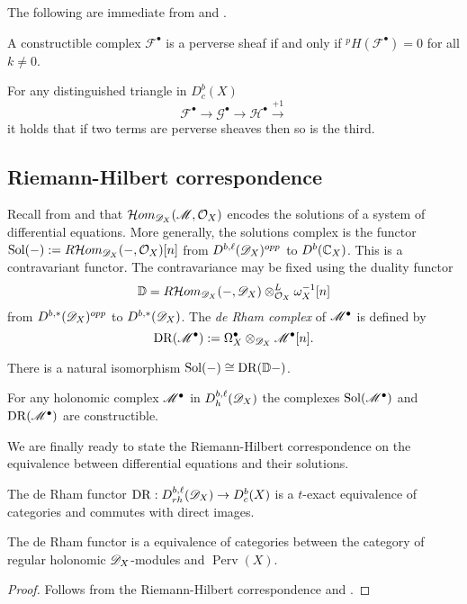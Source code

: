   The following are immediate from  and .
  \begin{proposition}
    A constructible complex $\mathcal{F}^\bullet$ is a perverse sheaf if and only if $^pH(\mathcal{F}^\bullet) = 0$ for all $k\neq 0$.
  \end{proposition}
  \begin{proposition}
    For any distinguished triangle in $D_c^b(X)$
    $$\mathcal{F}^\bullet \to \mathcal{G}^\bullet \to \mathcal{H}^\bullet \xrightarrow{+1} $$
    it holds that if two terms are perverse sheaves then so is the third.
  \end{proposition}
\subsection{Riemann-Hilbert correspondence}
  Recall from  and  that $\mathcal{H}om_{\mathscr{D}_X}(\mathscr{M}, \mathcal{O}_X)$ encodes the solutions of a system of differential equations.
  More generally, the solutions complex is the functor $\operatorname{Sol}({-}) := R \mathcal{H}om_{\mathscr{D}_X}({-},\mathcal{O}_X)[n]$ from $D^{b,\ell}(\mathscr{D}_X)^{opp}$ to $D^{b}(\mathbb{C}_X)$.
  This is a contravariant functor.
  The contravariance may be fixed using the duality functor
  $$\mathbb{D} = R\mathcal{H}om_{\mathscr{D}_X}({-},\mathscr{D}_X)\otimes_{\mathcal{O}_X}^L\omega_X^{-1}[n]$$
  from $D^{b,*}(\mathscr{D}_X)^{opp}$ to $D^{b,*}(\mathscr{D}_X)$.
  The {\it de Rham complex} of $\mathscr{M}^\bullet$ is defined by
  $$\operatorname{DR}(\mathscr{M}^\bullet):=\Omega_X^\bullet \otimes_{\mathscr{D}_X} \mathscr{M}^\bullet[n]. $$
  \begin{proposition}{\cite[Theorem 5.3.1. ]{dimca2004sheaves}}
    There is a natural isomorphism $\operatorname{Sol}({-}) \cong \operatorname{DR}(\mathbb{D}{-})$.
  \end{proposition}
  \begin{proposition}{\cite[Theorem 5.3.1.]{dimca2004sheaves}}
    For any holonomic complex $\mathscr{M}^\bullet$ in $D_h^{b,\ell}(\mathscr{D}_X)$ the complexes $\operatorname{Sol}(\mathscr{M}^\bullet)$ and $\operatorname{DR}(\mathscr{M}^\bullet)$ are constructible.
  \end{proposition}
  We are finally ready to state the Riemann-Hilbert correspondence on the equivalence between differential equations and their solutions.
  \begin{theorem}
    The de Rham functor $\operatorname{DR}:D_{rh}^{b,\ell}(\mathscr{D}_X)\allowbreak \to D_c^b(X)$ is a $t$-exact equivalence of categories and commutes with direct images.
  \end{theorem}
  \begin{corollary}
    The de Rham functor is a equivalence of categories between the category of regular holonomic $\mathscr{D}_X$-modules and $\operatorname{Perv}(X)$.
  \end{corollary}
  \begin{proof}
    Follows from the Riemann-Hilbert correspondence and .
  \end{proof}
